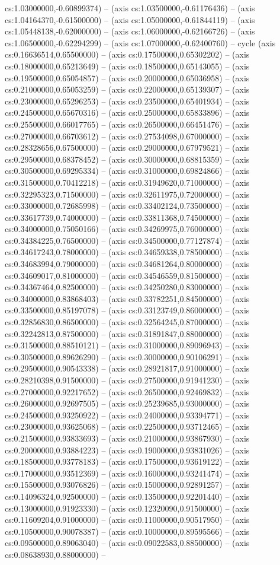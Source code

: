 cs:1.03000000,-0.60899374) -- (axis cs:1.03500000,-0.61176436) -- (axis cs:1.04164370,-0.61500000) -- (axis cs:1.05000000,-0.61844119) -- (axis cs:1.05448138,-0.62000000) -- (axis cs:1.06000000,-0.62166726) -- (axis cs:1.06500000,-0.62294299) -- (axis cs:1.07000000,-0.62400760) -- cycle (axis cs:0.16636514,0.65500000) -- (axis cs:0.17500000,0.65302202) -- (axis cs:0.18000000,0.65213649) -- (axis cs:0.18500000,0.65143055) -- (axis cs:0.19500000,0.65054857) -- (axis cs:0.20000000,0.65036958) -- (axis cs:0.21000000,0.65053259) -- (axis cs:0.22000000,0.65139307) -- (axis cs:0.23000000,0.65296253) -- (axis cs:0.23500000,0.65401934) -- (axis cs:0.24500000,0.65670316) -- (axis cs:0.25000000,0.65833896) -- (axis cs:0.25500000,0.66017765) -- (axis cs:0.26500000,0.66451476) -- (axis cs:0.27000000,0.66703612) -- (axis cs:0.27534098,0.67000000) -- (axis cs:0.28328656,0.67500000) -- (axis cs:0.29000000,0.67979521) -- (axis cs:0.29500000,0.68378452) -- (axis cs:0.30000000,0.68815359) -- (axis cs:0.30500000,0.69295334) -- (axis cs:0.31000000,0.69824866) -- (axis cs:0.31500000,0.70412218) -- (axis cs:0.31949620,0.71000000) -- (axis cs:0.32295323,0.71500000) -- (axis cs:0.32611975,0.72000000) -- (axis cs:0.33000000,0.72685998) -- (axis cs:0.33402124,0.73500000) -- (axis cs:0.33617739,0.74000000) -- (axis cs:0.33811368,0.74500000) -- (axis cs:0.34000000,0.75050166) -- (axis cs:0.34269975,0.76000000) -- (axis cs:0.34384225,0.76500000) -- (axis cs:0.34500000,0.77127874) -- (axis cs:0.34617243,0.78000000) -- (axis cs:0.34659338,0.78500000) -- (axis cs:0.34683994,0.79000000) -- (axis cs:0.34681264,0.80000000) -- (axis cs:0.34609017,0.81000000) -- (axis cs:0.34546559,0.81500000) -- (axis cs:0.34367464,0.82500000) -- (axis cs:0.34250280,0.83000000) -- (axis cs:0.34000000,0.83868403) -- (axis cs:0.33782251,0.84500000) -- (axis cs:0.33500000,0.85197078) -- (axis cs:0.33123749,0.86000000) -- (axis cs:0.32856830,0.86500000) -- (axis cs:0.32564245,0.87000000) -- (axis cs:0.32242813,0.87500000) -- (axis cs:0.31891847,0.88000000) -- (axis cs:0.31500000,0.88510121) -- (axis cs:0.31000000,0.89096943) -- (axis cs:0.30500000,0.89626290) -- (axis cs:0.30000000,0.90106291) -- (axis cs:0.29500000,0.90543338) -- (axis cs:0.28921817,0.91000000) -- (axis cs:0.28210398,0.91500000) -- (axis cs:0.27500000,0.91941230) -- (axis cs:0.27000000,0.92217652) -- (axis cs:0.26500000,0.92469832) -- (axis cs:0.26000000,0.92697505) -- (axis cs:0.25239685,0.93000000) -- (axis cs:0.24500000,0.93250922) -- (axis cs:0.24000000,0.93394771) -- (axis cs:0.23000000,0.93625068) -- (axis cs:0.22500000,0.93712465) -- (axis cs:0.21500000,0.93833693) -- (axis cs:0.21000000,0.93867930) -- (axis cs:0.20000000,0.93884223) -- (axis cs:0.19000000,0.93831026) -- (axis cs:0.18500000,0.93778183) -- (axis cs:0.17500000,0.93619122) -- (axis cs:0.17000000,0.93512369) -- (axis cs:0.16000000,0.93241474) -- (axis cs:0.15500000,0.93076826) -- (axis cs:0.15000000,0.92891257) -- (axis cs:0.14096324,0.92500000) -- (axis cs:0.13500000,0.92201440) -- (axis cs:0.13000000,0.91923330) -- (axis cs:0.12320090,0.91500000) -- (axis cs:0.11609204,0.91000000) -- (axis cs:0.11000000,0.90517950) -- (axis cs:0.10500000,0.90078387) -- (axis cs:0.10000000,0.89595566) -- (axis cs:0.09500000,0.89063040) -- (axis cs:0.09022583,0.88500000) -- (axis cs:0.08638930,0.88000000) -- 